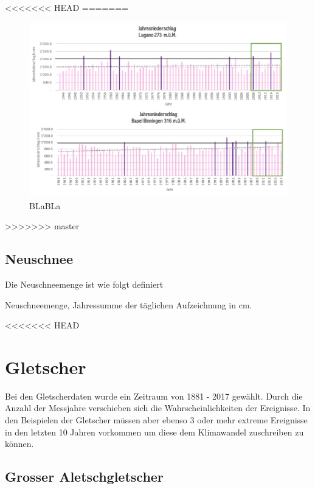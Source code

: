 \begin{refsection}
<<<<<<< HEAD
=======
\begin{figure}[htbp]
\centering
\includegraphics[width=1.0\textwidth]{extrem/Jahresniederschlag.pdf}
\caption{BLaBLa}
\label{Jahresniederschlag}
\end{figure}
>>>>>>> master


\subsection{Neuschnee}
Die Neuschneemenge ist wie folgt definiert

\begin{definition}
Neuschneemenge, Jahressumme der täglichen Aufzeichnung in cm.
\end{definition}

<<<<<<< HEAD


\section{Gletscher}
Bei den Gletscherdaten wurde ein Zeitraum von 1881 - 2017 gewählt. Durch die Anzahl der Messjahre verschieben sich die Wahrscheinlichkeiten der Ereignisse. In den Beispielen der Gletscher müssen aber ebenso 3 oder mehr extreme Ereignisse in den letzten 10 Jahren vorkommen um diese dem Klimawandel zuschreiben zu können.

\subsection{Grosser Aletschgletscher}


\end{refsection}
